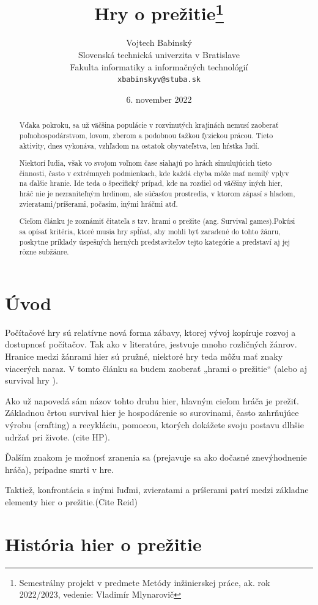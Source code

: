 \documentclass[10pt,twoside,slovak,a4paper]{article}
\title{Hry o prežitie\thanks{Semestrálny projekt v predmete Metódy inžinierskej práce, ak. rok 2022/2023, vedenie: Vladimír Mlynarovič}} %
\author{Vojtech Babinský\\[2pt]
	{\small Slovenská technická univerzita v Bratislave}\\
	{\small Fakulta informatiky a informačných technológií}\\
	{\small \texttt{xbabinskyv@stuba.sk}}
	}
\date{\small 6. november 2022} %
\begin{document}
\maketitle

\begin{abstract}

Vďaka pokroku, sa už väčšina populácie v rozvinutých krajinách nemusí zaoberať poľnohospodárstvom, lovom, zberom a podobnou ťažkou fyzickou prácou. Tieto aktivity, dnes vykonáva, vzhľadom na ostatok obyvateľstva, len hŕstka ľudí. 

Niektorí ľudia, však vo svojom voľnom čase siahajú po hrách simulujúcich tieto činnosti, často v extrémnych podmienkach, kde každá chyba môže mať nemilý vplyv na ďalšie hranie. Ide teda o špecifický prípad, kde na rozdiel od väčšiny iných hier, hráč nie je nezraniteľným hrdinom, ale súčasťou prostredia, v ktorom zápasí s hladom, zvieratami/príšerami, počasím, inými hráčmi atď. 

Cieľom článku je zoznámiť čitateľa s tzv. hrami o prežite (ang. Survival games).Pokúsi sa opísať kritéria, ktoré musia hry spĺňať, aby mohli byť zaradené do tohto žánru, poskytne príklady  úspešných herných predstaviteľov tejto kategórie a predstaví aj jej rôzne subžánre. 
\end{abstract}


\newpage


\section{Úvod}
Počítačové hry sú relatívne nová forma zábavy, ktorej vývoj kopíruje rozvoj a dostupnosť počítačov. Tak ako v literatúre, jestvuje mnoho rozličných žánrov. Hranice medzi žánrami hier sú pružné, niektoré hry teda môžu mať znaky viacerých naraz. V tomto článku sa budem zaoberať „hrami o prežitie“ (alebo aj survival hry ). 

Ako už napovedá sám názov tohto druhu hier, hlavným cieľom hráča je prežiť. Základnou črtou survival hier je hospodárenie so surovinami, často zahrňujúce výrobu (crafting) a recykláciu, pomocou, ktorých dokážete svoju postavu dlhšie udržať pri živote. (cite HP). 

Ďalším znakom je možnosť zranenia sa (prejavuje sa ako dočasné znevýhodnenie hráča), prípadne smrti v hre. 

Taktiež, konfrontácia s inými ľuďmi, zvieratami a príšerami patrí medzi základne elementy hier o prežitie.(Cite Reid)


\section{História hier o prežitie }
\end{document}
